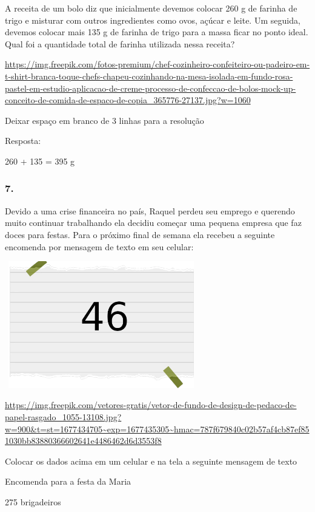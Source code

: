 A receita de um bolo diz que inicialmente devemos colocar 260 g de
farinha de trigo e misturar com outros ingredientes como ovos, açúcar e
leite. Um seguida, devemos colocar mais 135 g de farinha de trigo para a
massa ficar no ponto ideal. Qual foi a quantidade total de farinha
utilizada nessa receita?

\url{https://img.freepik.com/fotos-premium/chef-cozinheiro-confeiteiro-ou-padeiro-em-t-shirt-branca-toque-chefs-chapeu-cozinhando-na-mesa-isolada-em-fundo-rosa-pastel-em-estudio-aplicacao-de-creme-processo-de-confeccao-de-bolos-mock-up-conceito-de-comida-de-espaco-de-copia_365776-27137.jpg?w=1060}

Deixar espaço em branco de 3 linhas para a resolução

Resposta:

260 + 135 = 395 g

\subsubsection{7.}\label{section-22}

Devido a uma crise financeira no país, Raquel perdeu seu emprego e
querendo muito continuar trabalhando ela decidiu começar uma pequena
empresa que faz doces para festas. Para o próximo final de semana ela
recebeu a seguinte encomenda por mensagem de texto em seu celular:

\includegraphics[width=3.30833in,height=2.17391in]{media/image2.png}

\url{https://img.freepik.com/vetores-gratis/vetor-de-fundo-de-design-de-pedaco-de-papel-rasgado_1055-13108.jpg?w=900\&t=st=1677434705~exp=1677435305~hmac=787f679840c02b57af4cb87ef851030bb83880366602641e4486462d6d3553f8}

Colocar os dados acima em um celular e na tela a seguinte mensagem de
texto

Encomenda para a festa da Maria

275 brigadeiros

